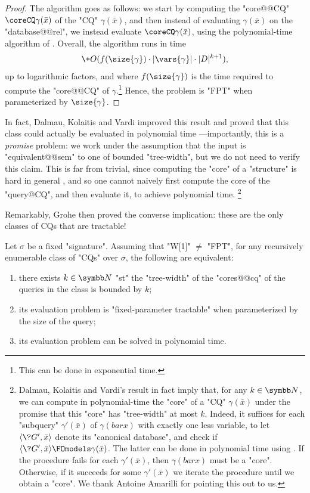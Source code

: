 \begin{proof}
	The algorithm goes as follows:
	we start by computing the "core@@CQ" $\coreCQ\gamma(\bar x)$
	of the "CQ" $\gamma(\bar x)$, and then instead of evaluating
	$\gamma(\bar x)$ on the "database@@rel", we instead evaluate
	$\coreCQ\gamma(\bar x)$, using the polynomial-time algorithm
	of .
	Overall, the algorithm runs in time
	\[
		\+O(f(\size{\gamma})\cdot|\vars{\gamma}|\cdot |D|^{k+1}),
	\]
	up to logarithmic factors, and where $f(\size{\gamma})$
	is the time required to compute the "core@@CQ" of
	$\gamma$.\footnote[][-3.5cm]{This can be done in exponential time.}
	Hence, the problem is "FPT" when parameterized by $\size{\gamma}$.
\end{proof}

In fact, Dalmau, Kolaitis and Vardi improved this result and
proved that this class could actually be evaluated in polynomial time
\cite[Corollary~5]{DalmauKolaitisVardi2002Constraint}---importantly,
this is a \emph{promise} problem: we work under the assumption that the input
is "equivalent@@sem" to one of bounded "tree-width", but we do not need to verify this claim.
This is far from trivial, since computing the "core"
of a "structure" is hard in general \cite[Theorem~7]{HellNesetril1992Core}, and so
one cannot naively first compute the core of the "query@CQ", and then evaluate it, to
achieve polynomial time.%
\footnote[][-7cm]{Dalmau, Kolaitis and Vardi's result in fact imply that,
for any $k\in\N$, we can compute in polynomial-time the "core" of a
"CQ" $\gamma(\bar x)$ under the promise that this "core" has "tree-width" at most $k$.
Indeed, it suffices for each "subquery" $\gamma'(\bar x)$ of $\gamma(bar x)$ with
exactly one less variable,
to let $\tup{\?G', \bar x}$ denote its "canonical database", and check if
$\tup{\?G', \bar x} \FOmodels \gamma(\bar x)$. The latter can be done in polynomial time
using \cite[Corollary~5]{DalmauKolaitisVardi2002Constraint}. If the procedure fails
for each $\gamma'(\bar x)$, then $\gamma(bar x)$ must be a "core". Otherwise,
if it succeeds for some $\gamma'(\bar x)$ we iterate the procedure until we obtain a "core".
We thank Antoine Amarilli for pointing this out to us.}

Remarkably, Grohe then proved the converse implication: these 
are the only classes of CQs that are tractable!
\begin{proposition}
	Let $\sigma$ be a fixed "signature".
	Assuming that "W[1]" $\neq$ "FPT", for any recursively enumerable
	class of "CQs" over $\sigma$, the following are equivalent:
	\begin{enumerate}
		\item there exists $k\in\N$ "st" the "tree-width" of the "cores@@cq"
			of the queries in the class is bounded by $k$;
		\item its evaluation problem is "fixed-parameter tractable"
			when parameterized by the size of the query;
		\item its evaluation problem can be solved in polynomial time.
	\end{enumerate}
\end{proposition}

